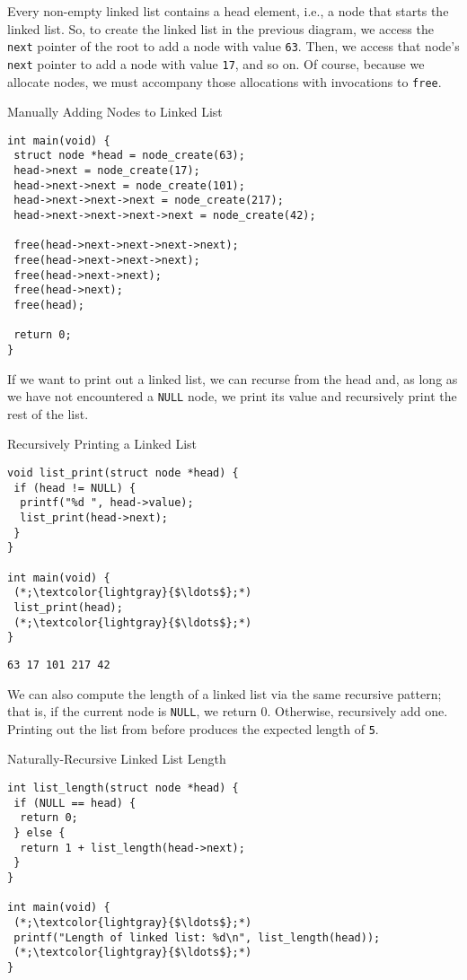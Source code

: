 Every non-empty linked list contains a head element, i.e., a node that starts the linked list. So, to create the linked list in the previous diagram, we access the \texttt{next} pointer of the root to add a node with value \texttt{63}. Then, we access that node's \texttt{next} pointer to add a node with value \texttt{17}, and so on. Of course, because we allocate nodes, we must accompany those allocations with invocations to \texttt{free}.

\begin{cl}[main.c]{Manually Adding Nodes to Linked List}\begin{lstlisting}[language=MyC]
int main(void) {
 struct node *head = node_create(63);
 head->next = node_create(17);
 head->next->next = node_create(101);
 head->next->next->next = node_create(217);
 head->next->next->next->next = node_create(42);

 free(head->next->next->next->next);
 free(head->next->next->next);
 free(head->next->next);
 free(head->next);
 free(head);
    
 return 0;
}
\end{lstlisting}\end{cl}

If we want to print out a linked list, we can recurse from the head and, as long as we have not encountered a \texttt{NULL} node, we print its value and recursively print the rest of the list.

\begin{cloast}[main.c]{Recursively Printing a Linked List}\begin{lstlisting}[language=MyC]
void list_print(struct node *head) {
 if (head != NULL) {
  printf("%d ", head->value);
  list_print(head->next);
 }
}

int main(void) {
 (*;\textcolor{lightgray}{$\ldots$};*)
 list_print(head);
 (*;\textcolor{lightgray}{$\ldots$};*)
}
\end{lstlisting}
\tcblower
\begin{lstlisting}[language=MyOutput]
63 17 101 217 42
\end{lstlisting}
\end{cloast}

We can also compute the length of a linked list via the same recursive pattern; that is, if the current node is \texttt{NULL}, we return 0. Otherwise, recursively add one. Printing out the list from before produces the expected length of \texttt{5}.

\begin{cl}[main.c]{Naturally-Recursive Linked List Length}\begin{lstlisting}[language=MyC]
int list_length(struct node *head) {
 if (NULL == head) {
  return 0;
 } else {
  return 1 + list_length(head->next);
 }
}

int main(void) {
 (*;\textcolor{lightgray}{$\ldots$};*)
 printf("Length of linked list: %d\n", list_length(head));
 (*;\textcolor{lightgray}{$\ldots$};*)
}
\end{lstlisting}\end{cl}


